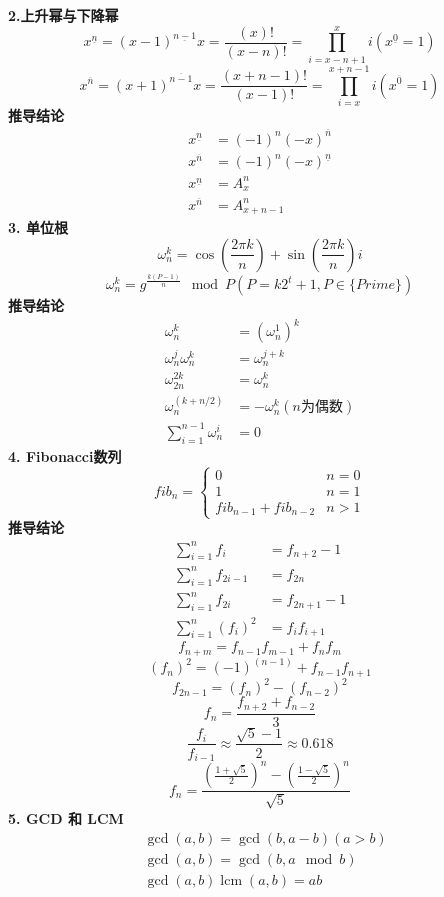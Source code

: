 \textbf{2.上升幂与下降幂}
$$x^{\underline{n}}=(x-1)^{\underline{n-1}}x=\frac{(x)!}{(x-n)!}=\prod_{i=x-n+1}^{x} i (x^{\underline{0}}=1)$$
$$x^{\overline{n}}=(x+1)^{\overline{n-1}}x=\frac{(x+n-1)!}{(x-1)!}=\prod_{i=x}^{x+n-1} i (x^{\overline{0}}=1)$$
\textbf{推导结论}
$$
\begin{aligned}
x^{\underline{n}}&=(-1)^n(-x)^{\overline{n}} \\
x^{\overline{n}}&=(-1)^n(-x)^{\underline{n}}\\
x^{\underline{n}}&=A_{x}^{n}\\
x^{\overline{n}}&=A_{x+n-1}^{n}
\end{aligned}
$$
\textbf{3. 单位根}
$$\omega_{n}^{k}=\cos(\frac{2\pi k}{n})+\sin(\frac{2\pi k}{n})i$$
$$\omega_{n}^{k}=g^{\frac{k(P-1)}{n}}\mod P (P=k2^{t}+1,P\in \{Prime\})$$
\textbf{推导结论}
$$
\begin{aligned}
\omega_{n}^{k}&=(\omega_{n}^{1})^{k}\\
\omega_{n}^{j}\omega_{n}^{k}&=\omega_{n}^{j+k}\\
\omega_{2n}^{2k}&=\omega_{n}^{k}\\
\omega_{n}^{(k+n/2)}&=-\omega_{n}^{k} (n 为偶数 )\\
\sum_{i=1}^{n-1}\omega_{n}^{i}&=0
\end{aligned}
$$
\textbf{4. Fibonacci数列}
$$fib_{n}=\begin{cases}0&n=0\\ 1&n=1\\ fib_{n-1}+fib_{n-2}&n>1\end{cases}$$
\textbf{推导结论}
$$
\begin{aligned}
\sum_{i=1}^{n}{f_{i}}&=f_{n+2}-1\\
\sum_{i=1}^{n}{f_{2i-1}}&=f_{2n}\\
\sum_{i=1}^{n}{f_{2i}}&=f_{2n+1}-1\\
\sum_{i=1}^{n}{(f_{i})^2}&=f_{i}f_{i+1}
\end{aligned}
$$
$$f_{n+m}=f_{n-1}f_{m-1}+f_{n}f_{m}$$
$$(f_{n})^2=(-1)^{(n-1)}+f_{n-1}f_{n+1}$$
$$f_{2n-1}=(f_{n})^2-(f_{n-2})^2$$
$$f_{n}=\frac{f_{n+2}+f_{n-2}}{3}$$
$$\frac{f_{i}}{f_{i-1}} \approx \frac{\sqrt{5}-1}{2} \approx 0.618$$
$$f_{n}=\frac{\left(\frac{1+\sqrt{5}}{2}\right)^{n}-\left(\frac{1-\sqrt{5}}{2}\right)^{n}}{\sqrt{5}} $$
\textbf{5. GCD 和 LCM}
$$
\begin{aligned}
&\gcd(a,b)=\gcd(b,a-b) (a>b)\\
&\gcd(a,b)=\gcd(b,a \mod b)\\
&\gcd(a,b)\operatorname{lcm}(a,b)=ab
\end{aligned}
$$
